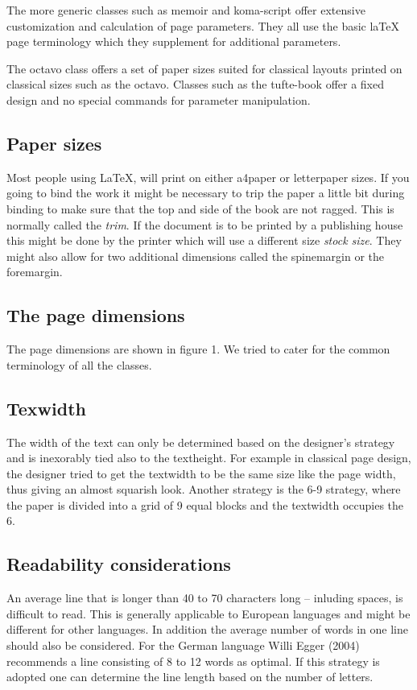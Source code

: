 The more generic classes such as memoir and koma-script offer extensive customization and calculation of page parameters. They all use the basic laTeX page terminology which they supplement for additional parameters.

The octavo class offers a set of paper sizes suited for classical layouts printed on classical sizes such as the octavo. Classes such as the tufte-book offer a fixed design and no special commands for parameter manipulation.
\subsection{Paper sizes}
Most people using LaTeX, will print on either a4paper or letterpaper sizes. If you going to bind the work it might be necessary to trip the paper a little bit during binding to make sure that the top and side of the book are not ragged. This is normally called the \textit{trim}. If the document is to be printed by a publishing house this might be done by the printer which will use a different size \textit{stock size}. They might also allow for two additional dimensions called the spinemargin or the foremargin.

\subsection{The page dimensions}

The page dimensions are shown in figure 1. We tried to cater for the common terminology of all the classes.

\subsection{Texwidth}

The width of the text can only be determined based on the designer's strategy and is inexorably tied also to
the textheight. For example in classical page design, the designer tried to get the textwidth to be the same size like
the page width, thus giving an almost squarish look. Another strategy is the 6-9 strategy, where the paper is divided into a grid of 9 equal blocks and the textwidth occupies the 6. 

\subsection{Readability considerations}

An average line that is longer than 40 to 70 characters long -- inluding spaces, is difficult to read. This is generally applicable to European languages and might be different for other languages. In addition the average number of words in one line should also be considered. For the German language Willi Egger (2004) recommends a line consisting of 8 to 12 words as optimal. If this strategy is adopted one can determine the line length based on the number of letters.

